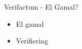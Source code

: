 \begin{frame}{Verifactum - El Gamal?}

\begin{itemize}
\item El gamal
\item Verifiering
\end{itemize}

\end{frame}